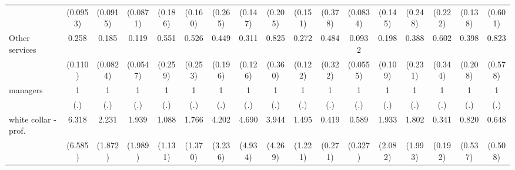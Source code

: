 {\begin{tabular}{l*{16}{c}}
                    &    (0.0953)         &    (0.0915)         &    (0.0871)         &     (0.186)         &     (0.160)         &     (0.265)         &     (0.147)         &     (0.205)         &     (0.151)         &     (0.378)         &    (0.0834)         &     (0.145)         &     (0.248)         &     (0.222)         &     (0.138)         &     (0.601)         \\
[1em]
Other services      &       0.258\sym{**} &       0.185\sym{***}&       0.119\sym{***}&       0.551         &       0.526         &       0.449         &       0.311\sym{**} &       0.825         &       0.272\sym{**} &       0.484         &      0.0932\sym{***}&       0.198\sym{**} &       0.388         &       0.602         &       0.398         &       0.823         \\
                    &     (0.110)         &    (0.0824)         &    (0.0547)         &     (0.259)         &     (0.253)         &     (0.196)         &     (0.126)         &     (0.360)         &     (0.122)         &     (0.322)         &    (0.0555)         &     (0.109)         &     (0.231)         &     (0.344)         &     (0.208)         &     (0.578)         \\
[1em]
managers            &           1         &           1         &           1         &           1         &           1         &           1         &           1         &           1         &           1         &           1         &           1         &           1         &           1         &           1         &           1         &           1         \\
                    &         (.)         &         (.)         &         (.)         &         (.)         &         (.)         &         (.)         &         (.)         &         (.)         &         (.)         &         (.)         &         (.)         &         (.)         &         (.)         &         (.)         &         (.)         &         (.)         \\
[1em]
white collar - prof.&       6.318         &       2.231         &       1.939         &       1.088         &       1.766         &       4.202         &       4.690         &       3.944         &       1.495         &       0.419         &       0.589         &       1.933         &       1.802         &       0.341         &       0.820         &       0.648         \\
                    &     (6.585)         &     (1.872)         &     (1.989)         &     (1.131)         &     (1.370)         &     (3.236)         &     (4.934)         &     (4.269)         &     (1.221)         &     (0.271)         &     (0.327)         &     (2.082)         &     (1.993)         &     (0.192)         &     (0.537)         &     (0.508)         \\

\end{tabular}}

